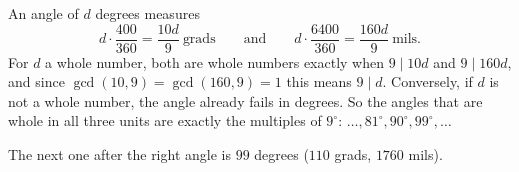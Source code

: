 An angle of $d$ degrees measures
\[
d\cdot\dfrac{400}{360}=\dfrac{10d}{9}\ \text{grads}\qquad\text{and}\qquad d\cdot\dfrac{6400}{360}=\dfrac{160d}{9}\ \text{mils}.
\]
For $d$ a whole number, both are whole numbers exactly when $9\mid10d$ and $9\mid160d$, and since $\gcd(10,9)=\gcd(160,9)=1$ this means $9\mid d$. Conversely, if $d$ is not a whole number, the angle already fails in degrees. So the angles that are whole in all three units are exactly the multiples of $9^\circ$: $\dots,81^\circ,90^\circ,99^\circ,\dots$

The next one after the right angle is $\boxed{99}$ degrees ($110$ grads, $1760$ mils).

